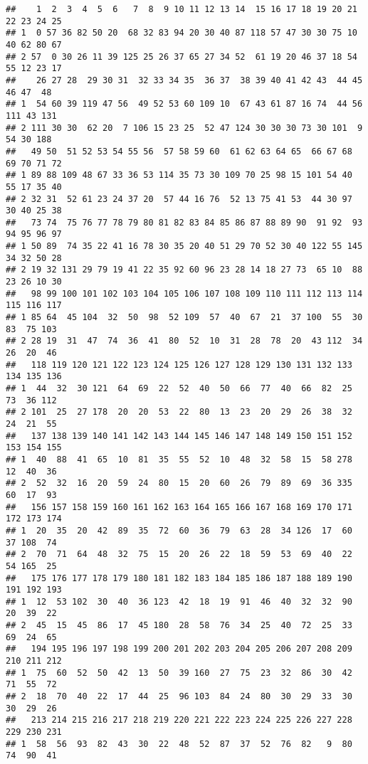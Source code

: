 \documentclass[
]{article}
\begin{document}
\begin{verbatim}
##    1  2  3  4  5  6   7  8  9 10 11 12 13 14  15 16 17 18 19 20 21 22 23 24 25
## 1  0 57 36 82 50 20  68 32 83 94 20 30 40 87 118 57 47 30 30 75 10 40 62 80 67
## 2 57  0 30 26 11 39 125 25 26 37 65 27 34 52  61 19 20 46 37 18 54 55 12 23 17
##    26 27 28  29 30 31  32 33 34 35  36 37  38 39 40 41 42 43  44 45  46 47  48
## 1  54 60 39 119 47 56  49 52 53 60 109 10  67 43 61 87 16 74  44 56 111 43 131
## 2 111 30 30  62 20  7 106 15 23 25  52 47 124 30 30 30 73 30 101  9  54 30 188
##   49 50  51 52 53 54 55 56  57 58 59 60  61 62 63 64 65  66 67 68 69 70 71 72
## 1 89 88 109 48 67 33 36 53 114 35 73 30 109 70 25 98 15 101 54 40 55 17 35 40
## 2 32 31  52 61 23 24 37 20  57 44 16 76  52 13 75 41 53  44 30 97 30 40 25 38
##   73 74  75 76 77 78 79 80 81 82 83 84 85 86 87 88 89 90  91 92  93 94 95 96 97
## 1 50 89  74 35 22 41 16 78 30 35 20 40 51 29 70 52 30 40 122 55 145 34 32 50 28
## 2 19 32 131 29 79 19 41 22 35 92 60 96 23 28 14 18 27 73  65 10  88 23 26 10 30
##   98 99 100 101 102 103 104 105 106 107 108 109 110 111 112 113 114 115 116 117
## 1 85 64  45 104  32  50  98  52 109  57  40  67  21  37 100  55  30  83  75 103
## 2 28 19  31  47  74  36  41  80  52  10  31  28  78  20  43 112  34  26  20  46
##   118 119 120 121 122 123 124 125 126 127 128 129 130 131 132 133 134 135 136
## 1  44  32  30 121  64  69  22  52  40  50  66  77  40  66  82  25  73  36 112
## 2 101  25  27 178  20  20  53  22  80  13  23  20  29  26  38  32  24  21  55
##   137 138 139 140 141 142 143 144 145 146 147 148 149 150 151 152 153 154 155
## 1  40  88  41  65  10  81  35  55  52  10  48  32  58  15  58 278  12  40  36
## 2  52  32  16  20  59  24  80  15  20  60  26  79  89  69  36 335  60  17  93
##   156 157 158 159 160 161 162 163 164 165 166 167 168 169 170 171 172 173 174
## 1  20  35  20  42  89  35  72  60  36  79  63  28  34 126  17  60  37 108  74
## 2  70  71  64  48  32  75  15  20  26  22  18  59  53  69  40  22  54 165  25
##   175 176 177 178 179 180 181 182 183 184 185 186 187 188 189 190 191 192 193
## 1  12  53 102  30  40  36 123  42  18  19  91  46  40  32  32  90  20  39  22
## 2  45  15  45  86  17  45 180  28  58  76  34  25  40  72  25  33  69  24  65
##   194 195 196 197 198 199 200 201 202 203 204 205 206 207 208 209 210 211 212
## 1  75  60  52  50  42  13  50  39 160  27  75  23  32  86  30  42  71  55  72
## 2  18  70  40  22  17  44  25  96 103  84  24  80  30  29  33  30  30  29  26
##   213 214 215 216 217 218 219 220 221 222 223 224 225 226 227 228 229 230 231
## 1  58  56  93  82  43  30  22  48  52  87  37  52  76  82   9  80  74  90  41

\end{verbatim}
\end{document}
